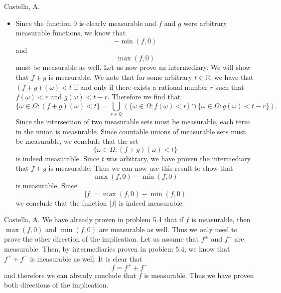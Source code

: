 \begin{solution}[5.4]{Castella, A.}
\begin{itemize}
        $$
            -\max(-f,-g)
        $$
        must be measurable as well. Finally we note that
        $$
            \min(f,g) = -\max(-f,-g),
        $$
        which implies that $\min(f,g)$ is a measurable function.
        \item Since the function $0$ is clearly measurable and $f$ and $g$ were arbitrary measurable functions, we know that
        $$
            -\min(f,0)
        $$
        and
        $$
            \max(f,0)
        $$
        must be measurable as well. Let us now prove an intermediary. We will show that $f+g$ is measurable. We note that for some arbitrary $t \in \mathbb{R}$, we have that $(f+g)(\omega) < t$ if and only if there exists a rational number $r$ such that $f(\omega) < r$ and $g(\omega) < t-r$. Therefore we find that
        $$
            \{\omega \in \Omega : (f+g)(\omega) < t\} = \bigcup_{r\in\mathbb{Q}}\left(\{\omega \in \Omega : f(\omega) < r\}\cap \{\omega \in \Omega : g(\omega) < t-r\}\right).
        $$
        Since the intersection of two measurable sets must be measurable, each term in the union is measurable. Since countable unions of measurable sets must be measurable, we conclude that the set
        $$
            \{\omega \in \Omega : (f+g)(\omega) < t\}
        $$
        is indeed measurable. Since $t$ was arbitrary, we have proven the intermediary that $f+g$ is measurable. Thus we can now use this result to show that
        $$
            \max(f,0) - \min(f,0)
        $$
        is measurable. Since
        $$
            |f| = \max(f,0) - \min(f,0)
        $$
        we conclude that the function $|f|$ is indeed measurable.
    \end{itemize}
\end{solution}

\begin{solution}[5.14]{Castella, A.}
    We have already proven in problem 5.4 that if $f$ is measurable, then $\max(f,0)$ and $\min(f,0)$ are measurable as well. Thus we only need to prove the other direction of the implication. Let us assume that $f^+$ and $f^-$ are measurable. Then, by intermediaries proven in problem 5.4, we know that $f^+ + f^-$ is measurable as well. It is clear that
    $$
        f = f^+ + f^-
    $$
    and therefore we can already conclude that $f$ is measurable. Thus we have proven both directions of the implication. 
\end{solution}